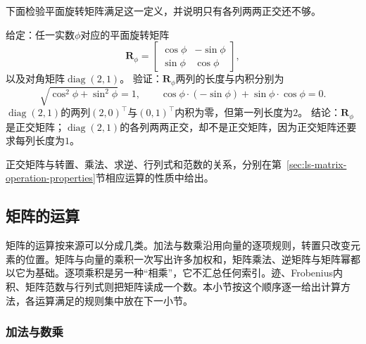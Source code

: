 下面检验平面旋转矩阵满足这一定义，并说明只有各列两两正交还不够。
\begin{example}[平面旋转是正交矩阵]
\label{ex:ls-rotation-orthogonal}
给定：任一实数$\phi$对应的平面旋转矩阵
\[
 \bm R_\phi=\begin{bmatrix}\cos\phi&-\sin\phi\\\sin\phi&\cos\phi\end{bmatrix},
\]
以及对角矩阵$\operatorname{diag}(2,1)$。
验证：$\bm R_\phi$两列的长度与内积分别为
\[
 \sqrt{\cos^2\phi+\sin^2\phi}=1,\qquad
 \cos\phi\cdot(-\sin\phi)+\sin\phi\cdot\cos\phi=0.
\]$\operatorname{diag}(2,1)$的两列$(2,0)^\top$与$(0,1)^\top$内积为零，但第一列长度为$2$。
结论：$\bm R_\phi$是正交矩阵；$\operatorname{diag}(2,1)$的各列两两正交，却不是正交矩阵，因为正交矩阵还要求每列长度为$1$。
\end{example}
正交矩阵与转置、乘法、求逆、行列式和范数的关系，分别在第~\ref{sec:ls-matrix-operation-properties}节相应运算的性质中给出。

\subsection{矩阵的运算}
\label{sec:ls-matrix-operations}
\label{sec:ls-multiplication}

矩阵的运算按来源可以分成几类。加法与数乘沿用向量的逐项规则，转置只改变元素的位置。矩阵与向量的乘积一次写出许多加权和，矩阵乘法、逆矩阵与矩阵幂都以它为基础。逐项乘积是另一种“相乘”，它不汇总任何索引。迹、Frobenius内积、矩阵范数与行列式则把矩阵读成一个数。本小节按这个顺序逐一给出计算方法，各运算满足的规则集中放在下一小节。

\subsubsection{加法与数乘}

